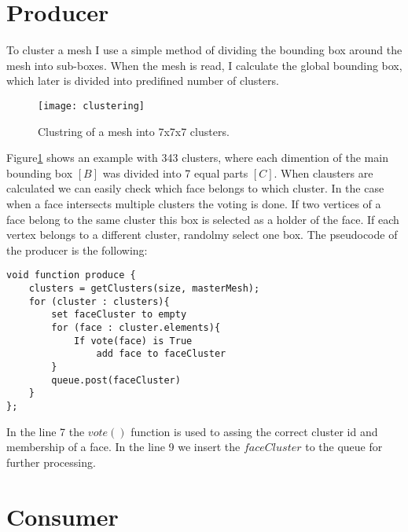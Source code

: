 \section{Producer}

To cluster a mesh I use a simple method of dividing the bounding box around the mesh into sub-boxes. When the mesh is read, I calculate the global bounding box, which later is divided into predifined number of clusters.

\begin{figure}[H]
  \begin{center}
    \texttt{[image: clustering]}
    \caption{Clustring of a mesh into 7x7x7 clusters.}
    \label{fig:clustering}
  \end{center}
\end{figure}

Figure\ref{fig:clustering} shows an example with 343 clusters, where each dimention of the main bounding box $[B]$ was divided into 7 equal parts $[C]$. When clausters are calculated we can easily check which face belongs to which cluster. In the case when a face intersects multiple clusters the voting is done. If two vertices of a face belong to the same cluster this box is selected as a holder of the face. If each vertex belongs to a different cluster, randolmy select one box. The pseudocode of the producer is the following:
\newline
\begin{center}
\begin{lstlisting}[caption={C style psuedocode of a producer},captionpos=b]
void function produce {
    clusters = getClusters(size, masterMesh);
    for (cluster : clusters){
        set faceCluster to empty
        for (face : cluster.elements){
            If vote(face) is True
                add face to faceCluster
        }
        queue.post(faceCluster)
    }
};
\end{lstlisting}
\end{center}

In the line 7 the $vote()$ function is used to assing the correct cluster id and membership of a face. In the line 9 we insert the $faceCluster$ to the queue for further processing.

\section{Consumer}
